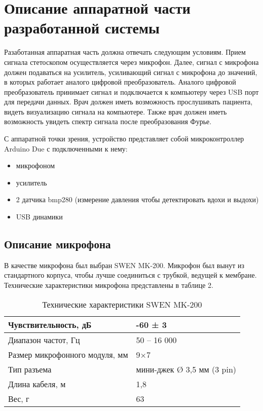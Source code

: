 \documentclass[../main.tex]{subfiles}
\begin{document}
\section{Описание аппаратной части разработанной системы}

Разаботанная аппаратная часть должна отвечать следующим условиям. Прием сигнала стетоскопом осуществляется через микрофон. Далее, сигнал с микрофона должен подаваться на усилитель, усиливающий сигнал с микрофона до значений, в которых работает аналого цифровой преобразователь. Аналого цифровой преобразователь принимает сигнал и подключается к компьютеру через USB порт для передачи данных. Врач должен иметь возможность прослушивать пациента, видеть визуализацию сигнала на компьютере. Также врач должен иметь возможность увидеть спектр сигнала после преобразования Фурье.

С аппаратной точки зрения, устройство представляет собой микроконтроллер Arduino Due с подключенными к нему:
\begin{itemize}
\item микрофоном
\item усилитель
\item 2 датчика bmp280 (измерение давления чтобы детектировать вдохи и выдохи)
\item USB динамики
\end{itemize}



\subsection{Описание микрофона}
В качестве микрофона был выбран SWEN MK-200. Микрофон был вынут из стандартного корпуса, чтобы лучше соединиться с трубкой, ведущей к мембране. Технические характеристики микрофона представлены в таблице 2.

\begin{table}[h]
\centering
\caption{Технические характеристики SWEN MK-200}
\begin{tabular}{|l|l|}
\hline
Чувствительность, дБ           & -60 ± 3                    \\ \hline
Диапазон частот, Гц            & 50 – 16 000                \\ \hline
Размер микрофонного модуля, мм & 9×7                        \\ \hline
Тип разъема                    & мини-джек Ø 3,5 мм (3 pin) \\ \hline
Длина кабеля, м                & 1,8                        \\ \hline
Вес, г                         & 63                         \\ \hline
\end{tabular}
\end{table}
\end{document}
